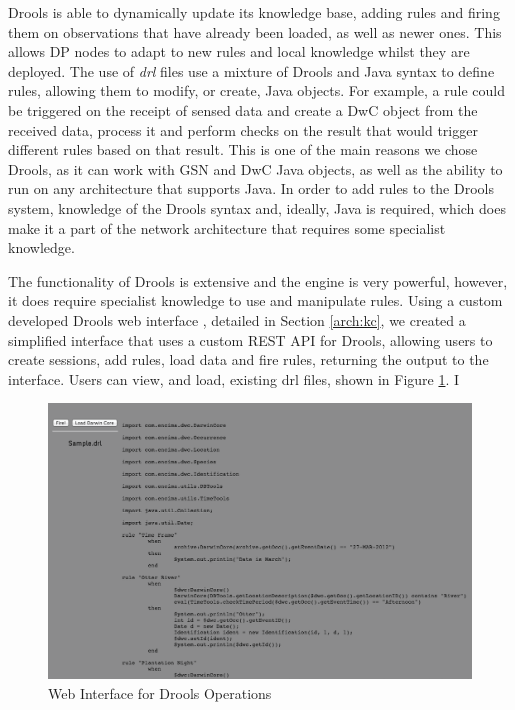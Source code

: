 	Drools is able to dynamically update its knowledge base, adding rules and firing them on observations that have already been loaded, as well as newer ones. This allows DP nodes to adapt to new rules and local knowledge whilst they are deployed. The use of \textit{drl} files use a mixture of Drools and Java syntax to define rules, allowing them to modify, or create, Java objects. For example, a rule could be triggered on the receipt of sensed data and create a DwC object from the received data, process it and perform checks on the result that would trigger different rules based on that result. This is one of the main reasons we chose Drools, as it can work with GSN and DwC Java objects, as well as the ability to run on any architecture that supports Java. In order to add rules to the Drools system, knowledge of the Drools syntax and, ideally, Java is required, which does make it a part of the network architecture that requires some specialist knowledge. 
	
	The functionality of Drools is extensive and the engine is very powerful, however, it does require specialist knowledge to use and manipulate rules. Using a custom developed Drools web interface , detailed in Section \ref{arch:kc}, we created a simplified interface that uses a custom REST API for Drools, allowing users to create sessions, add rules, load data and fire rules, returning the output to the interface. Users can view, and load, existing drl files, shown in Figure \ref{kc:loris_drl}. I
	
		\begin{figure}[h]
		\centering
		\includegraphics[width=\textwidth]{Chap4/figures/rules}
		\caption{Web Interface for Drools Operations}
		\label{kc:loris_drl}
		\end{figure}
	
